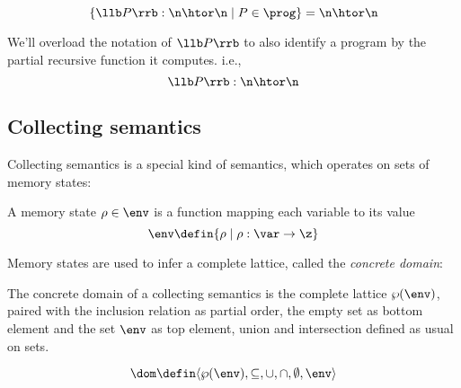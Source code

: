 \begin{observation}
  \[\{\llb P \rrb : \n \htor \n \mid P \in \prog\} = \n \htor \n\]
\end{observation}

\begin{notation}[I/O semantics]
  We'll overload the notation of \(\llb P\rrb\) to also identify a
  program by the partial recursive function it computes. i.e., \[\llb
  P \rrb : \n \htor \n\]
\end{notation}





\subsection{Collecting semantics}


Collecting semantics is a special kind of semantics, which operates on
sets of memory states:

\begin{definition}\label{def:states}
  A memory state \(\rho \in \env\) is a function mapping each variable
  to its value \[\env \defin \{\rho \mid \rho : \var \to \z\}\]
\end{definition}

Memory states are used to infer a complete lattice, called the
\emph{concrete domain}:

\begin{definition}\label{def:concrete}
  The concrete domain of a collecting semantics is the complete
  lattice \(\wp(\env)\), paired with the inclusion relation as partial
  order, the empty set as bottom element and the set \(\env\) as top
  element, union and intersection defined as usual on sets.

  \[\dom \defin \langle \wp(\env), \subseteq, \cup, \cap,
  \emptyset, \env \rangle\]
\end{definition}


